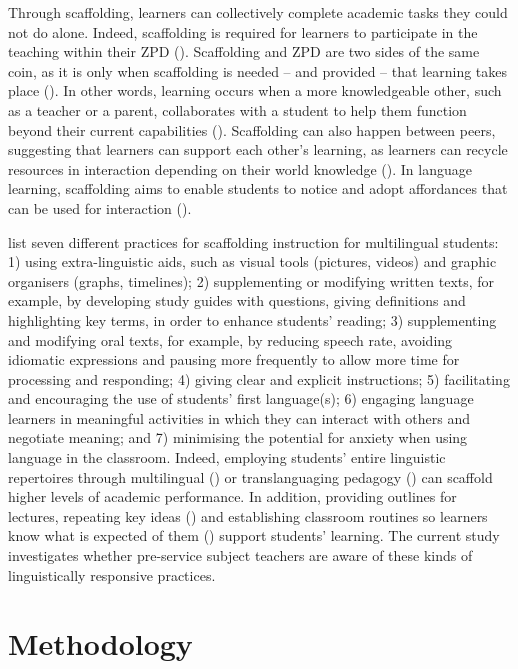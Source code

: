 \documentclass[output=paper]{langscibook}
\begin{document}
Through scaffolding, learners can collectively complete academic tasks they could not do alone. Indeed, scaffolding is required for learners to participate in the teaching within their ZPD (\citealt{Vygotsky1978}). Scaffolding and ZPD are two sides of the same coin, as it is only when scaffolding is needed – and provided – that learning takes place (\citealt{Gibbons2014}). In other words, learning occurs when a more knowledgeable other, such as a teacher or a parent, collaborates with a student to help them function beyond their current capabilities (\citealt{Gibbons2014, Walqui2010-1}). Scaffolding can also happen between peers, suggesting that learners can support each other’s learning, as learners can recycle resources in interaction depending on their world knowledge (\citealt{Walqui2010-1}). In language learning, scaffolding aims to enable students to notice and adopt affordances that can be used for interaction (\citealt{Lier2000}).

\citet{Lucas2008-3} list seven different practices for scaffolding instruction for multilingual students: 1) using extra-linguistic aids, such as visual tools (pictures, videos) and graphic organisers (graphs, timelines); 2) supplementing or modifying written texts, for example, by developing study guides with questions, giving definitions and highlighting key terms, in order to enhance students’ reading; 3) supplementing and modifying oral texts, for example, by reducing speech rate, avoiding idiomatic expressions and pausing more frequently to allow more time for processing and responding; 4) giving clear and explicit instructions; 5) facilitating and encouraging the use of students’ first language(s); 6) engaging language learners in meaningful activities in which they can interact with others and negotiate meaning; and 7) minimising the potential for anxiety when using language in the classroom. Indeed, employing students’ entire linguistic repertoires through multilingual (\citealt{Cummins2021}) or translanguaging pedagogy (\citealt{Garcia2009-2}) can scaffold higher levels of academic performance. In addition, providing outlines for lectures, repeating key ideas (\citealt{Gibbons2014}) and establishing classroom routines so learners know what is expected of them (\citealt{WillettEtAl2007}) support students’ learning. The current study investigates whether pre-service subject teachers are aware of these kinds of linguistically responsive practices.

\section{Methodology}\label{sec:heikkola:4}
\end{document}
